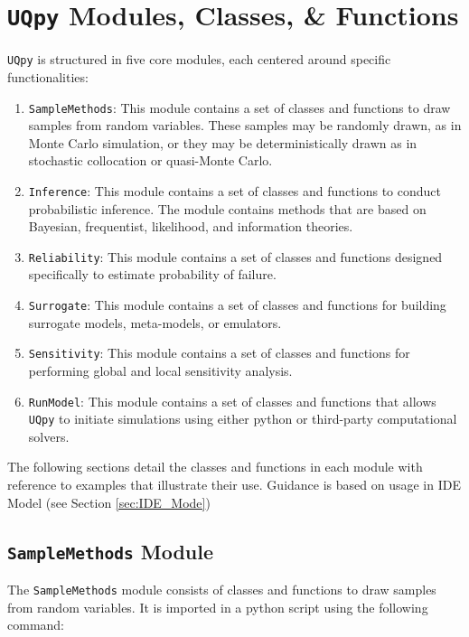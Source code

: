 \documentclass[./UsersGuide.tex]{subfiles}
\begin{document}
\section{\texttt{UQpy} Modules, Classes, \& Functions}

\texttt{UQpy} is structured in five core modules, each centered around specific functionalities:
\begin{enumerate}
\item \texttt{SampleMethods}: This module contains a set of classes and functions to draw samples from random variables. These samples may be randomly drawn, as in Monte Carlo simulation, or they may be deterministically drawn as in stochastic collocation or quasi-Monte Carlo.
\item \texttt{Inference}: This module contains a set of classes and functions to conduct probabilistic inference. The module contains methods that are based on Bayesian, frequentist, likelihood, and information theories. 
\item \texttt{Reliability}: This module contains a set of classes and functions designed specifically to estimate probability of failure.
\item \texttt{Surrogate}: This module contains a set of classes and functions for building surrogate models, meta-models, or emulators.
\item \texttt{Sensitivity}: This module contains a set of classes and functions for performing global and local sensitivity analysis.
\item \texttt{RunModel}: This module contains a set of classes and functions that allows \texttt{UQpy} to initiate simulations using either python or third-party computational solvers.
\end{enumerate}
The following sections detail the classes and functions in each module with reference to examples that illustrate their use. Guidance is based on usage in IDE Model (see Section \ref{sec:IDE_Mode})


\subsection{\texttt{SampleMethods} Module}

The \texttt{SampleMethods} module consists of classes and functions to draw samples from random variables. It is imported in a python script using the following command:
\end{document}
